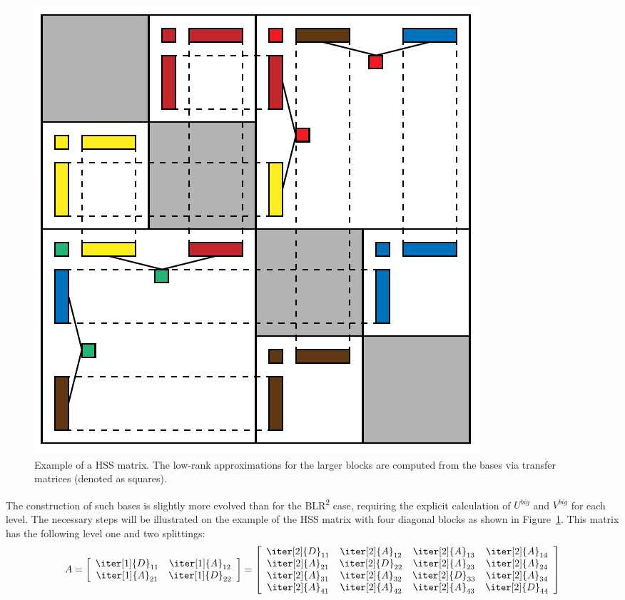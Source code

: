 \begin{figure}[h]
    \centering
    \includegraphics[width=0.6\linewidth]{chapters/4_hierarchical_matrices/figures/HSS.pdf}
    \caption[Hierarchical Semi-Separable Matrix]{Example of a HSS matrix. The low-rank approximations for the larger blocks are computed from the bases via transfer matrices (denoted as squares).}
    \label{fig:hss}
\end{figure}

The construction of such bases is slightly more evolved than for the BLR\textsuperscript{2} case, requiring the explicit calculation of $U^{big}$ and $V^{big}$ for each level. The necessary steps will be illustrated on the example of the HSS matrix with four diagonal blocks as shown in Figure~\hyperref[fig:hss]{\ref{fig:hss}}. This matrix has the following level one and two splittings:
\begin{equation}
  A = 
  \left[
    \begin{array}{cc}
      \iter[1]{D}_{11}& \iter[1]{A}_{12} \\
      \iter[1]{A}_{21} & \iter[1]{D}_{22} \\
    \end{array}
  \right]
  =     
  \left[
    \begin{array}{cccc}
      \iter[2]{D}_{11}& \iter[2]{A}_{12} & \iter[2]{A}_{13}& \iter[2]{A}_{14} \\
      \iter[2]{A}_{21} & \iter[2]{D}_{22} & \iter[2]{A}_{23}& \iter[2]{A}_{24} \\
      \iter[2]{A}_{31} & \iter[2]{A}_{32} & \iter[2]{D}_{33}& \iter[2]{A}_{34} \\
      \iter[2]{A}_{41} & \iter[2]{A}_{42} & \iter[2]{A}_{43}& \iter[2]{D}_{44} \\
    \end{array}
  \right]
\end{equation}

